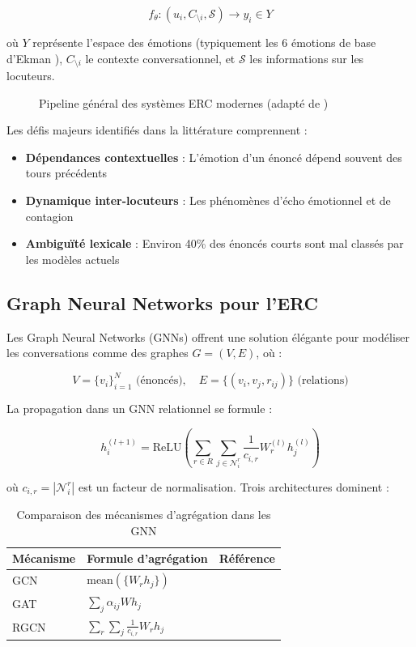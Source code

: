 \documentclass[a4paper,11pt]{article}
\begin{document}
\[
f_\theta: (u_i, C_{\setminus i}, \mathcal{S}) \rightarrow y_i \in Y
\]

où $Y$ représente l'espace des émotions (typiquement les 6 émotions de base d'Ekman \cite{ekman1992argument}), $C_{\setminus i}$ le contexte conversationnel, et $\mathcal{S}$ les informations sur les locuteurs.

\begin{figure}[ht] %
    \centering
    \caption{Pipeline général des systèmes ERC modernes (adapté de \cite{zhang2023survey})}
    \label{fig:erc_pipeline}
\end{figure}

Les défis majeurs identifiés dans la littérature comprennent :
\begin{itemize}
    \item \textbf{Dépendances contextuelles} : L'émotion d'un énoncé dépend souvent des tours précédents \cite{ghosal2019dialoguegcn}
    \item \textbf{Dynamique inter-locuteurs} : Les phénomènes d'écho émotionnel et de contagion \cite{navarretta2016mirroring}
    \item \textbf{Ambiguïté lexicale} : Environ 40\% des énoncés courts sont mal classés par les modèles actuels \cite{li2021survey}
\end{itemize}

\subsection{Graph Neural Networks pour l'ERC}
Les Graph Neural Networks (GNNs) offrent une solution élégante pour modéliser les conversations comme des graphes $G = (V,E)$, où :

\[
V = \{v_i\}_{i=1}^N \text{ (énoncés)}, \quad E = \{(v_i,v_j,r_{ij})\} \text{ (relations)}
\]

La propagation dans un GNN relationnel se formule :

\[
h_i^{(l+1)} = \text{ReLU}\left(\sum_{r\in R}\sum_{j\in\mathcal{N}_i^r}\frac{1}{c_{i,r}}W_r^{(l)}h_j^{(l)}\right)
\]

où $c_{i,r} = |\mathcal{N}_i^r|$ est un facteur de normalisation. Trois architectures dominent :

\begin{table}[ht] %
    \centering
    \begin{tabular}{lll}
        \toprule
        Mécanisme & Formule d'agrégation & Référence \\
        \midrule
        GCN & $\text{mean}(\{W_r h_j\})$ & \cite{kipf2016semi} \\
        GAT & $\sum_j \alpha_{ij} W h_j$ & \cite{velickovic2017graph} \\
        RGCN & $\sum_r\sum_j \frac{1}{c_{i,r}}W_r h_j$ & \cite{schlichtkrull2018modeling} \\
        \bottomrule
    \end{tabular}
    \caption{Comparaison des mécanismes d'agrégation dans les GNN}
    \label{tab:gnn_types}
\end{table}
\end{document}
